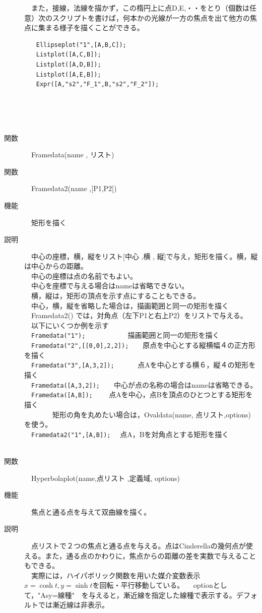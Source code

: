 \documentclass[papersize,a4paper,12pt,uplatex]{jsarticle}
\begin{document}
\begin{description}
　また，接線，法線を描かず，この楕円上に点D,E,・・をとり（個数は任意）次のスクリプトを書けば，何本かの光線が一方の焦点を出て他方の焦点に集まる様子を描くことができる。
\begin{verbatim}
　　Ellipseplot("1",[A,B,C]);
　　Listplot([A,C,B]);
　　Listplot([A,D,B]);
　　Listplot([A,E,B]);
　　Expr([A,"s2","F_1",B,"s2","F_2"]);
\end{verbatim}
　\\
　　\\
　\\

\hypertarget{framedata}{}
\item[関数]　Framedata(name , リスト)
\item[関数]　Framedata2(name ,[P1,P2])
\item[機能]　矩形を描く
\item[説明]　中心の座標，横，縦をリスト[中心 ,横 , 縦]で与え，矩形を描く。横，縦は中心からの距離。\\
　中心の座標は点の名前でもよい。\\
　中心を座標で与える場合はnameは省略できない。\\
　横，縦は，矩形の頂点を示す点にすることもできる。\\
　中心，横，縦を省略した場合は，描画範囲と同一の矩形を描く\\
　Framedata2() では，対角点（左下P1と右上P2）をリストで与える。\\
　以下にいくつか例を示す\\
　\verb|Framedata("1");|　　　　　　描画範囲と同一の矩形を描く\\
　\verb|Framedata("2",[[0,0],2,2]);|　　原点を中心とする縦横幅４の正方形を描く\\
　\verb|Framedata("3",[A,3,2]);|　　  　点Aを中心とする横６，縦４の矩形を描く\\
　\verb|Framedata([A,3,2]);|　　中心が点の名称の場合はnameは省略できる。\\
　\verb|Framedata([A,B]);|　　 点Aを中心，点Bを頂点のひとつとする矩形を描く\\
　　　　矩形の角を丸めたい場合は，Ovaldata(name, 点リスト,options)を使う。\\
　\verb|Framedata2("1",[A,B]);|　 点A，Bを対角点とする矩形を描く\\
　\\

\hypertarget{hyperbolaplot}{}
\item[関数]　Hyperbolaplot(name,点リスト ,定義域, options)
\item[機能]　焦点と通る点を与えて双曲線を描く。
\item[説明]　点リストで２つの焦点と通る点を与える。点はCinderellaの幾何点が使える。また，通る点のかわりに，焦点からの距離の差を実数で与えることもできる。\\
　実際には，ハイパボリック関数を用いた媒介変数表示 $x=\cosh t,y=\sinh t$を回転・平行移動している。
　optionとして，"Asy=線種"　を与えると，漸近線を指定した線種で表示する。デフォルトでは漸近線は非表示。\\


\end{description}
\end{document}
